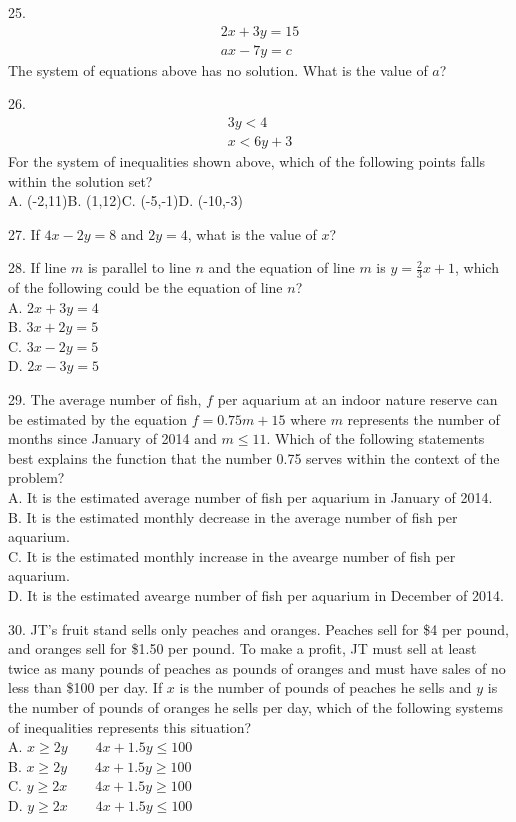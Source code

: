 \documentclass[../satmath.tex]{subfiles}
\begin{document}
25. 
\begin{align*}
2x+3y=15\\
ax-7y=c 
\end{align*}
The system of equations above has no solution. What is the value of $a$?
\medbreak

26. 
\begin{align*}
3y<4\\
x<6y+3
\end{align*}
For the system of inequalities shown above, which of the following points falls within the solution set?\\
A. (-2,11)\quad B. (1,12)\quad C. (-5,-1)\quad D. (-10,-3)
\medbreak

27. If $4x-2y=8$ and $2y=4$, what is the value of $x$?
\medbreak

28. If line $m$ is parallel to line $n$ and the equation of line $m$ is $y=\frac{2}{3}x+1$, which of the following could be the equation of line $n$?\\
A. $2x+3y=4$\\
B. $3x+2y=5$\\
C. $3x-2y=5$\\
D. $2x-3y=5$
\medbreak

29. The average number of fish, $f$ per aquarium at an indoor nature reserve can be estimated by the equation $f = 0.75m+15$ where $m$ represents 
the number of months since January of 2014 and $m\leq 11$. Which of the following statements best explains the function that the number 0.75 serves 
within the context of the problem?\\
A. It is the estimated average number of fish per aquarium in January of 2014.\\
B. It is the estimated monthly decrease in the average number of fish per aquarium.\\
C. It is the estimated monthly increase in the avearge number of fish per aquarium.\\
D. It is the estimated avearge number of fish per aquarium in December of 2014.
\medbreak

30. JT's fruit stand sells only peaches and oranges. Peaches sell for \$4 per pound, and oranges sell for \$1.50 per pound. To make a profit, 
JT must sell at least twice as many pounds of peaches as pounds of oranges and must have sales of no less than \$100 per day. If $x$ is the number of 
pounds of peaches he sells and $y$ is the number of pounds of oranges he sells per day, which of the following systems of inequalities represents this situation?\\
A. $x\geq 2y \qquad 4x+1.5y\leq 100$\\
B. $x\geq 2y \qquad 4x+1.5y\geq 100$\\
C. $y\geq 2x \qquad 4x+1.5y\geq 100$\\
D. $y\geq 2x \qquad 4x+1.5y\leq 100$
\medbreak
\end{document}
